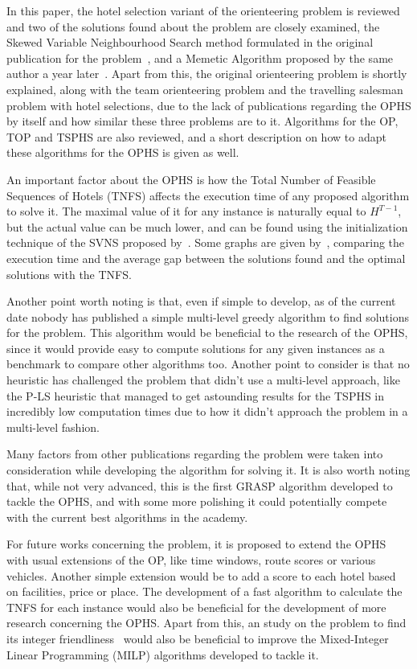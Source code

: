In this paper, the hotel selection variant of the orienteering problem is reviewed and two of the solutions found about the problem are closely examined, the Skewed Variable Neighbourhood Search method formulated in the original publication for the problem~\cite{divsalar2013}, and a Memetic Algorithm proposed by the same author a year later~\cite{divsalar2014}. Apart from this, the original orienteering problem is shortly explained, along with the team orienteering problem and the travelling salesman problem with hotel selections, due to the lack of publications regarding the OPHS by itself and how similar these three problems are to it. Algorithms for the OP, TOP and TSPHS are also reviewed, and a short description on how to adapt these algorithms for the OPHS is given as well.

An important factor about the OPHS is how the Total Number of Feasible Sequences of Hotels (TNFS) affects the execution time of any proposed algorithm to solve it. The maximal value of it for any instance is naturally equal to $H^{T-1}$, but the actual value can be much lower, and can be found using the initialization technique of the SVNS proposed by~\cite{divsalar2013}. Some graphs are given by~\cite{divsalar2014}, comparing the execution time and the average gap between the solutions found and the optimal solutions with the TNFS.

Another point worth noting is that, even if simple to develop, as of the current date nobody has published a simple multi-level greedy algorithm to find solutions for the problem. This algorithm would be beneficial to the research of the OPHS, since it would provide easy to compute solutions for any given instances as a benchmark to compare other algorithms too. Another point to consider is that no heuristic has challenged the problem that didn't use a multi-level approach, like the P-LS heuristic that managed to get astounding results for the TSPHS in incredibly low computation times due to how it didn't approach the problem in a multi-level fashion.

Many factors from other publications regarding the problem were taken into consideration while developing the algorithm for solving it. It is also worth noting that, while not very advanced, this is the first GRASP algorithm developed to tackle the OPHS, and with some more polishing it could potentially compete with the current best algorithms in the academy.

For future works concerning the problem, it is proposed to extend the OPHS with usual extensions of the OP, like time windows, route scores or various vehicles. Another simple extension would be to add a score to each hotel based on facilities, price or place. The development of a fast algorithm to calculate the TNFS for each instance would also be beneficial for the development of more research concerning the OPHS. Apart from this, an study on the problem to find its integer friendliness~\cite{revelle1993} would also be beneficial to improve the Mixed-Integer Linear Programming (MILP) algorithms developed to tackle it.

